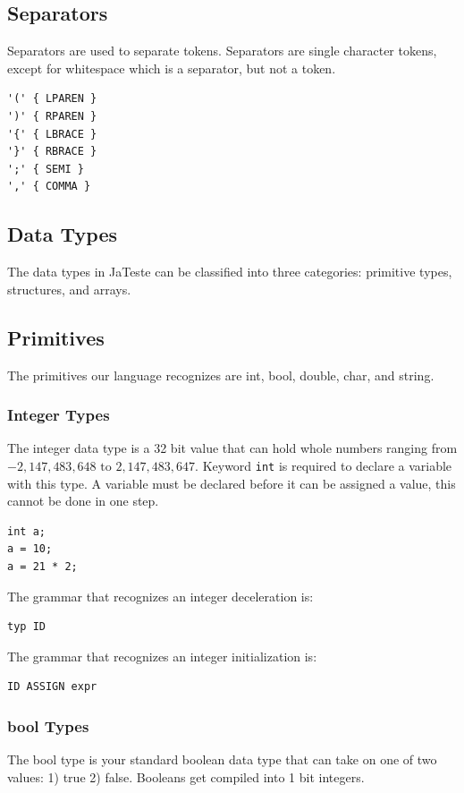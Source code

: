 \documentclass{article}
\begin{document}
\subsection{Separators}
Separators are used to separate tokens. Separators are single character tokens, except for whitespace which is a separator, but not a token. 
\begin{Verbatim}[frame=single]
'('	{ LPAREN }
')'	{ RPAREN }
'{'	{ LBRACE }
'}'	{ RBRACE }
';'	{ SEMI }
','	{ COMMA }
\end{Verbatim}

\subsection{Data Types}
The data types in JaTeste can be classified into three categories: primitive types, structures, and arrays. 

\subsection{Primitives}
The primitives our language recognizes are int, bool, double, char, and string. 

\subsubsection{Integer Types}
The integer data type is a 32 bit value that can hold whole numbers ranging from $-2,147,483,648 \text{ to } 2,147,483,647$. Keyword \texttt{int} is required to declare a variable with this type.  A variable must be declared before it can be assigned a value, this cannot be done in one step.

\begin{lstlisting}
int a;
a = 10;
a = 21 * 2;
\end{lstlisting}

The grammar that recognizes an integer deceleration is: 
\begin{Verbatim}[frame=single]
typ ID
\end{Verbatim}

The grammar that recognizes an integer initialization is: 
\begin{Verbatim}[frame=single]
ID ASSIGN expr
\end{Verbatim}

\subsubsection{bool Types}
The bool type is your standard boolean data type that can take on one of two values: 1) true 2) false. Booleans get compiled into 1 bit integers.
\end{document}
